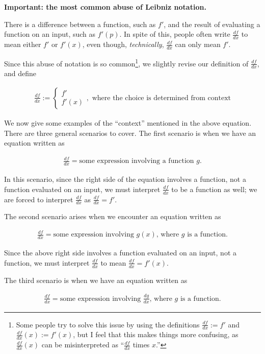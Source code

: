 \documentclass{article}
\begin{document}
\textbf{Important: the most common abuse of Leibniz notation.}

There is a difference between a function, such as $f'$, and the result of evaluating a function on an input, such as $f'(p)$. In spite of this, people often write $\frac{df}{dx}$ to mean either $f'$ or $f'(x)$, even though, \textit{technically}, $\frac{df}{dx}$ can only mean $f'$.

Since this abuse of notation is so common\footnote{Some people try to solve this issue by using the definitions $\frac{df}{dx} := f'$ and $\frac{df}{dx}(x) := f'(x)$, but I feel that this makes things more confusing, as $\frac{df}{dx}(x)$ can be misinterpreted as ``$\frac{df}{dx}$ times $x$.''}, we slightly revise our definition of $\frac{df}{dx}$, and define

\begin{align*}
    \boxed
    {
        \frac{df}{dx} := \begin{cases} f' \\ f'(x) \end{cases}, \text{ where the choice is determined from context}
    }
\end{align*}

We now give some examples of the ``context'' mentioned in the above equation. There are three general scenarios to cover. The first scenario is when we have an equation written as

\begin{align*}
    \frac{df}{dx} = \text{some expression involving a function $g$}.
\end{align*}

In this scenario, since the right side of the equation involves a function, not a function evaluated on an input, we must interpret $\frac{df}{dx}$ to be a function as well; we are forced to interpret $\frac{df}{dx}$ as $\frac{df}{dx} = f'$.

The second scenario arises when we encounter an equation written as

\begin{align*}
    \frac{df}{dx} = \text{some expression involving $g(x)$, where $g$ is a function}.
\end{align*}

Since the above right side involves a function evaluated on an input, not a function, we must interpret $\frac{df}{dx}$ to mean $\frac{df}{dx} = f'(x)$.

The third scenario is when we have an equation written as

\begin{align*}
    \frac{df}{dx} = \text{some expression involving $\frac{dg}{dx}$, where $g$ is a function}.
\end{align*}
\end{document}
